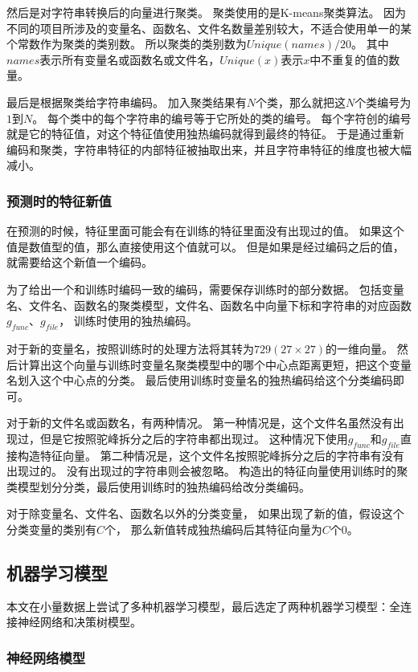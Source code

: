 然后是对字符串转换后的向量进行聚类。
聚类使用的是K-means聚类算法。
因为不同的项目所涉及的变量名、函数名、文件名数量差别较大，不适合使用单一的某个常数作为聚类的类别数。
所以聚类的类别数为$Unique(names) / 20$。
其中$names$表示所有变量名或函数名或文件名，$Unique(x)$表示$x$中不重复的值的数量。

最后是根据聚类给字符串编码。
加入聚类结果有$N$个类，那么就把这$N$个类编号为$1$到$N$。
每个类中的每个字符串的编号等于它所处的类的编号。
每个字符创的编号就是它的特征值，对这个特征值使用独热编码就得到最终的特征。
于是通过重新编码和聚类，字符串特征的内部特征被抽取出来，并且字符串特征的维度也被大幅减小。

\subsubsection{预测时的特征新值}

在预测的时候，特征里面可能会有在训练的特征里面没有出现过的值。
如果这个值是数值型的值，那么直接使用这个值就可以。
但是如果是经过编码之后的值，就需要给这个新值一个编码。

为了给出一个和训练时编码一致的编码，需要保存训练时的部分数据。
包括变量名、文件名、函数名的聚类模型，文件名、函数名中向量下标和字符串的对应函数$g_{func}$、$g_{file}$，
训练时使用的独热编码。

对于新的变量名，按照训练时的处理方法将其转为$729 (27 \times 27)$的一维向量。
然后计算出这个向量与训练时变量名聚类模型中的哪个中心点距离更短，把这个变量名划入这个中心点的分类。
最后使用训练时变量名的独热编码给这个分类编码即可。

对于新的文件名或函数名，有两种情况。
第一种情况是，这个文件名虽然没有出现过，但是它按照驼峰拆分之后的字符串都出现过。
这种情况下使用$g_{func}$和$g_{file}$直接构造特征向量。
第二种情况是，这个文件名按照驼峰拆分之后的字符串有没有出现过的。
没有出现过的字符串则会被忽略。
构造出的特征向量使用训练时的聚类模型划分分类，最后使用训练时的独热编码给改分类编码。

对于除变量名、文件名、函数名以外的分类变量，
如果出现了新的值，假设这个分类变量的类别有$C$个，
那么新值转成独热编码后其特征向量为$C$个0。

\subsection{机器学习模型}

本文在小量数据上尝试了多种机器学习模型，最后选定了两种机器学习模型：全连接神经网络和决策树模型。

\subsubsection{神经网络模型}

